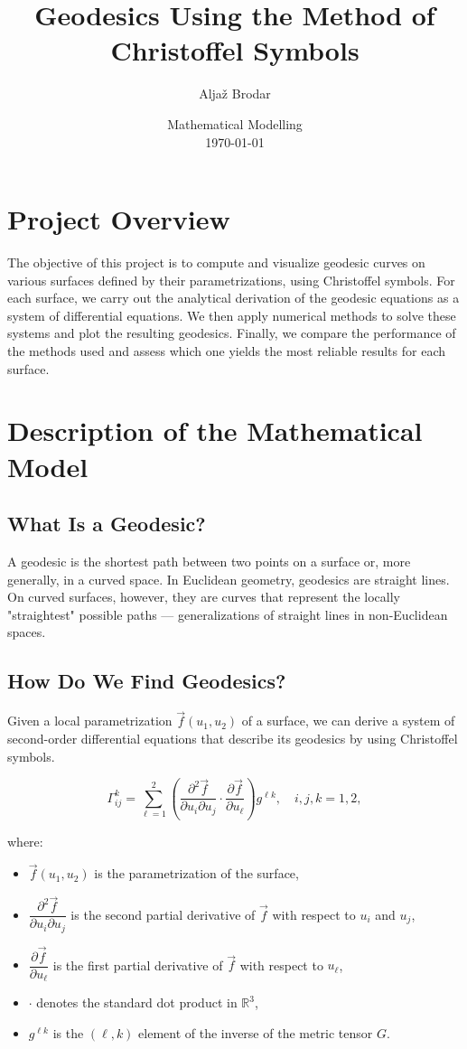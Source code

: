 \documentclass{article}
\title{Geodesics Using the Method of Christoffel Symbols}
\author{Aljaž Brodar}
\date{Mathematical Modelling \\[1em] \today}
\begin{document}
	\maketitle
	\newpage
	\tableofcontents
	\newpage
	
	\section{Project Overview}
	
	The objective of this project is to compute and visualize geodesic curves on various surfaces defined by their parametrizations, using Christoffel symbols. For each surface, we carry out the analytical derivation of the geodesic equations as a system of differential equations. We then apply numerical methods to solve these systems and plot the resulting geodesics. Finally, we compare the performance of the methods used and assess which one yields the most reliable results for each surface.
	\newpage
	\section{Description of the Mathematical Model}
	
	\subsection{What Is a Geodesic?}
	A geodesic is the shortest path between two points on a surface or, more generally, in a curved space. In Euclidean geometry, geodesics are straight lines. On curved surfaces, however, they are curves that represent the locally "straightest" possible paths — generalizations of straight lines in non-Euclidean spaces.
	
	\subsection{How Do We Find Geodesics?}
	Given a local parametrization $\vec{f}(u_1, u_2)$ of a surface, we can derive a system of second-order differential equations that describe its geodesics by using Christoffel symbols.
	
	\[
	\Gamma^k_{ij} = \sum_{\ell=1}^{2} 
	\left( 
	\frac{\partial^2 \vec{f}}{\partial u_i \partial u_j} 
	\cdot 
	\frac{\partial \vec{f}}{\partial u_\ell} 
	\right) 
	g^{\ell k}, \quad i,j,k = 1,2,
	\]
	
	where:
	\begin{itemize}
		\item $\vec{f}(u_1, u_2)$ is the parametrization of the surface,
		\item $\dfrac{\partial^2 \vec{f}}{\partial u_i \partial u_j}$ is the second partial derivative of $\vec{f}$ with respect to $u_i$ and $u_j$,
		\item $\dfrac{\partial \vec{f}}{\partial u_\ell}$ is the first partial derivative of $\vec{f}$ with respect to $u_\ell$,
		\item $\cdot$ denotes the standard dot product in $\mathbb{R}^3$,
		\item $g^{\ell k}$ is the $(\ell, k)$ element of the inverse of the metric tensor $G$.
	\end{itemize}
	
\end{document}
